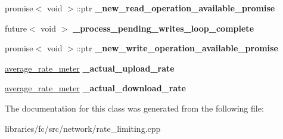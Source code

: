\begin{DoxyCompactItemize}
\item 
\mbox{\label{classfc_1_1detail_1_1rate__limiting__group__impl_ac27a30522117cbf377c837a1e21fefdb}} 
promise$<$ void $>$\+::ptr {\bfseries \+\_\+new\+\_\+read\+\_\+operation\+\_\+available\+\_\+promise}
\item 
\mbox{\label{classfc_1_1detail_1_1rate__limiting__group__impl_a2dfe2dbb88f981587d9fab0be48cccc4}} 
future$<$ void $>$ {\bfseries \+\_\+process\+\_\+pending\+\_\+writes\+\_\+loop\+\_\+complete}
\item 
\mbox{\label{classfc_1_1detail_1_1rate__limiting__group__impl_a0eb2b117fe73fe9b58ba6a4d7dfc7ed4}} 
promise$<$ void $>$\+::ptr {\bfseries \+\_\+new\+\_\+write\+\_\+operation\+\_\+available\+\_\+promise}
\item 
\mbox{\label{classfc_1_1detail_1_1rate__limiting__group__impl_aac40eb765de719da6eadf2074fbe6e17}} 
\mbox{\hyperlink{classfc_1_1detail_1_1average__rate__meter}{average\+\_\+rate\+\_\+meter}} {\bfseries \+\_\+actual\+\_\+upload\+\_\+rate}
\item 
\mbox{\label{classfc_1_1detail_1_1rate__limiting__group__impl_a866c9c96a0ad6aa3c5b867b0289ac9bc}} 
\mbox{\hyperlink{classfc_1_1detail_1_1average__rate__meter}{average\+\_\+rate\+\_\+meter}} {\bfseries \+\_\+actual\+\_\+download\+\_\+rate}
\end{DoxyCompactItemize}


The documentation for this class was generated from the following file\+:\begin{DoxyCompactItemize}
\item 
libraries/fc/src/network/rate\+\_\+limiting.\+cpp\end{DoxyCompactItemize}

